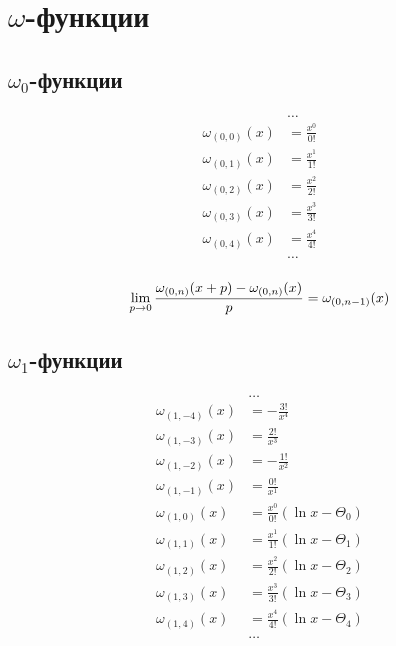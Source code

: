 
\section{$\omega$-функции}

\subsection{$\omega_0$-функции}

\begin{equation*}\begin{aligned}
&\ldots \\
\omega_{(0,0)}(x) &= \frac{x^0}{0!} \\
\omega_{(0,1)}(x) &= \frac{x^1}{1!} \\
\omega_{(0,2)}(x) &= \frac{x^2}{2!} \\
\omega_{(0,3)}(x) &= \frac{x^3}{3!} \\
\omega_{(0,4)}(x) &= \frac{x^4}{4!} \\
&\ldots \\
\end{aligned}\end{equation*}

\begin{equation*}
\lim_{p \to 0} \frac{\omega_{(0, n)}(x + p) - \omega_{(0, n)}(x)}{p} = \omega_{(0, n - 1)}(x) \\
\end{equation*}

\subsection{$\omega_1$-функции}

\begin{equation*} \begin{aligned}
&\ldots \\
\omega_{(1, -4)}(x) &=
- \frac{3!}{x^4} \\
\omega_{(1, -3)}(x) &=
  \frac{2!}{x^3} \\
\omega_{(1, -2)}(x) &=
- \frac{1!}{x^2} \\
\omega_{(1, -1)}(x) &=
  \frac{0!}{x^1} \\
\omega_{(1, 0)}(x) &= 
  \frac{x^0}{0!} \left(
  \ln{x} - \Theta_0 \right) \\
\omega_{(1, 1)}(x) &= 
  \frac{x^1}{1!} \left(
  \ln{x} - \Theta_1 \right) \\
\omega_{(1, 2)}(x) &= 
  \frac{x^2}{2!} \left(
  \ln{x} - \Theta_2 \right) \\
\omega_{(1, 3)}(x) &= 
  \frac{x^3}{3!} \left(
  \ln{x} - \Theta_3 \right) \\
\omega_{(1, 4)}(x) &= 
  \frac{x^4}{4!} \left(
  \ln{x} - \Theta_4 \right) \\
&\ldots \\
\end{aligned} \end{equation*}

